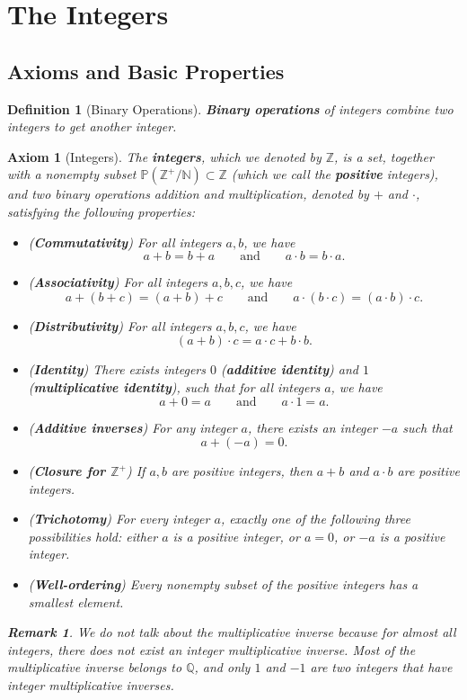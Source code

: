 \documentclass[12pt,a4paper]{article}
\newtheorem{ax}{Axiom}[section]
\newtheorem{df}{Definition}[subsection]
\newtheorem*{rmk}{\indent Remark}
\def\Z{{\mathbb{Z}}}
\def\Q{{\mathbb{Q}}}
\def\N{{\mathbb{N}}}
\def\Zp{{\Z^{+}}}
\begin{document}
\newpage
\section{The Integers}
\subsection{Axioms and Basic Properties}
\begin{df}[Binary Operations]
	\textbf{Binary operations} of integers combine two integers to get another integer.	
\end{df}

\begin{ax}[Integers]
	The \textbf{integers}, which we denoted by $\Z$, is a set, together with a nonempty subset $\mathbb{P}(\Zp/\N)\subset \Z$ (which we call the \textbf{positive} integers), and two binary operations addition and multiplication, denoted by $+$ and $\cdot$, satisfying the following properties: 
	\begin{itemize}
		\item (\textbf{Commutativity}) For all integers $a,b$, we have \[a+b=b+a\qquad\text{and}\qquad a\cdot b=b\cdot a.\]
		\item (\textbf{Associativity}) For all integers $a,b,c$, we have \[a+(b+c)=(a+b)+c\qquad\text{and}\qquad a\cdot(b\cdot c)=(a\cdot b)\cdot c.\]
		\item (\textbf{Distributivity}) For all integers $a,b,c$, we have \[(a+b)\cdot c=a\cdot c+b\cdot b.\]
		\item (\textbf{Identity}) There exists integers $0$ (\textbf{additive identity}) and $1$ (\textbf{multiplicative identity}), such that for all integers $a$, we have \[a+0=a\qquad\text{and}\qquad a\cdot1=a.\]
		\item (\textbf{Additive inverses}) For any integer $a$, there exists an integer $-a$ such that \[a+(-a)=0.\]
		\item (\textbf{Closure for $\Zp$}) If $a,b$ are positive integers, then $a+b$ and $a\cdot b$ are positive integers.
		\item (\textbf{Trichotomy}) For every integer $a$, exactly one of the following three possibilities hold: either $a$ is a positive integer, or $a=0$, or $-a$ is a positive integer. 
		\item (\textbf{Well-ordering}) Every nonempty subset of the positive integers has a smallest element. 
	\end{itemize}
	\begin{rmk} We do not talk about the multiplicative inverse because for almost all integers, there does not exist an integer multiplicative inverse. Most of the multiplicative inverse belongs to $\Q$, and only $1$ and $-1$ are two integers that have integer multiplicative inverses. \end{rmk}
\end{ax}
\end{document}
